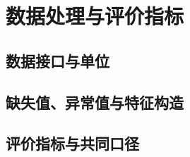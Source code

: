 \SectionStart
\section{数据处理与评价指标}
\subsection{数据接口与单位}
\subsection{缺失值、异常值与特征构造}
\subsection{评价指标与共同口径}
